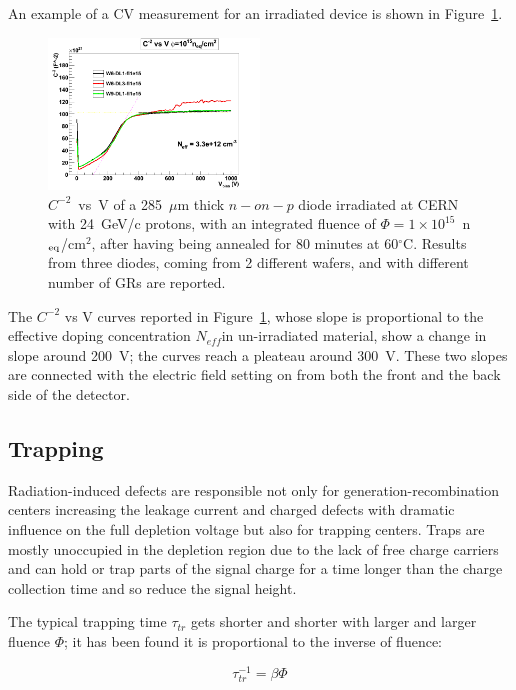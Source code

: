 An example of a CV measurement for an irradiated device is shown in Figure~\ref{fig:irrCV}.
\begin{figure}[htpb]
 \centering
\includegraphics[width=0.5\textwidth]{irrad2011-fl1e15-best.png}
 \caption{\label{fig:irrCV} $C^{-2}$~vs~V of a 285~$\mu$m thick $n-on-p$ diode irradiated at CERN 
 with 24~GeV/c protons, with an integrated fluence of $\Phi=1\times10^{15}$~n$_{\rm eq}$/cm$^2$, 
 after having being annealed for 80 minutes at 60$^\circ$C. Results from three diodes, 
 coming from 2 different 
 wafers, and with different number of GRs are reported.  
}  
 \end{figure}
 
 The $C^{-2}$ vs V curves reported in Figure~\ref{fig:irrCV}, whose slope is proportional to the 
 effective doping concentration $N_{eff}$in un-irradiated material, show a change in slope around 
 200~V; the curves reach a pleateau around 300~V. These two slopes are connected with the 
 electric field setting on from both the front and the back side of the detector.


\subsection{Trapping}
\label{sec:trapping}
Radiation-induced defects are responsible not only for generation-recombination centers increasing 
the leakage current and charged defects with dramatic influence on the full depletion voltage but 
also for trapping centers. Traps are mostly unoccupied in the depletion region due to the lack of free 
charge carriers and can hold or trap parts of the signal charge for a time longer than the charge 
collection time and so reduce the signal height. 

The typical trapping time $\tau_{tr}$ gets shorter and shorter with larger and larger fluence $\Phi$; it 
has 
been found it is proportional to the inverse of fluence:

\begin{equation}
\tau_{tr}^{-1}=\beta\Phi
\label{eq:trappingtime}
\end{equation}

